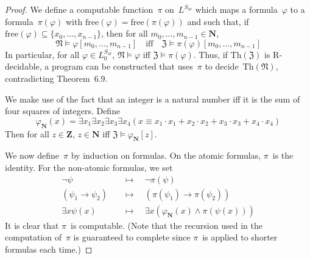 \documentclass[letterpaper]{article}
\newcommand{\N}{\mathbf{N}}
\newcommand{\Ns}{\mathfrak{N}}
\newcommand{\Z}{\mathbf{Z}}
\newcommand{\Zs}{\mathfrak{Z}}
\newcommand{\lequ}{\equiv}
\newcommand{\limp}{\rightarrow}
\newcommand{\free}{\mathrm{free}}
\newcommand{\thr}{\mathrm{Th}}
\theoremstyle{remark}
\begin{document}
\begin{proof}
We define a computable function~$\pi$ on~$L^{S_{\mathrm{ar}}}$ which maps a formula~$\varphi$ to a formula~$\pi(\varphi)$ with $\free(\varphi)=\free(\pi(\varphi))$ and such that, if $\free(\varphi)\subseteq\{x_0,\ldots,x_{n-1}\}$, then for all $m_0,\ldots,m_{n-1}\in\N$,
$$\Ns\models\varphi[m_0,\ldots,m_{n-1}]\quad\text{iff}\quad\Zs\models\pi(\varphi)[m_0,\ldots,m_{n-1}]$$
In particular, for all $\varphi\in L_0^{S_{\mathrm{ar}}}$, $\Ns\models\varphi$ iff $\Zs\models\pi(\varphi)$. Thus, if $\thr(\Zs)$ is R-decidable, a program can be constructed that uses~$\pi$ to decide~$\thr(\Ns)$, contradicting Theorem~6.9.

We make use of the fact that an integer is a natural number iff it is the sum of four squares of integers. Define
$$\varphi_{\N}(x)=\exists x_1\exists x_2\exists x_3\exists x_4(x\lequ x_1\cdot x_1+x_2\cdot x_2+x_3\cdot x_3+x_4\cdot x_4)$$
Then for all $z\in\Z$, $z\in\N$ iff $\Zs\models\varphi_{\N}[z]$.

We now define~$\pi$ by induction on formulas. On the atomic formulas, $\pi$~is the identity. For the non-atomic formulas, we set
\begin{align*}
\lnot\psi\quad&\mapsto\quad\lnot\pi(\psi)\\
(\psi_1\limp\psi_2)\quad&\mapsto\quad(\pi(\psi_1)\limp\pi(\psi_2))\\
\exists x\psi(x)\quad&\mapsto\quad\exists x(\varphi_{\N}(x)\land\pi(\psi(x)))
\end{align*}
It is clear that $\pi$~is computable. (Note that the recursion used in the computation of~$\pi$ is guaranteed to complete since $\pi$~is applied to shorter formulas each time.)


\end{proof}
\end{document}
